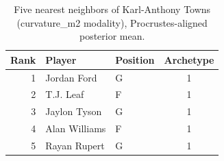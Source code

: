 \begin{table}[htbp]
  \centering\small
  \begin{tabular}{rllc}
    \toprule
    Rank & Player & Position & Archetype \\
    \midrule
    1 & Jordan Ford & G & 1 \\
    2 & T.J. Leaf & F & 1 \\
    3 & Jaylon Tyson & G & 1 \\
    4 & Alan Williams & F & 1 \\
    5 & Rayan Rupert & G & 1 \\
    \bottomrule
  \end{tabular}
  \caption{Five nearest neighbors of Karl-Anthony Towns (curvature_m2 modality), Procrustes-aligned posterior mean.}
  \label{tab:Karl_Anthony_Towns_neighbors_curvature_m2}
\end{table}

